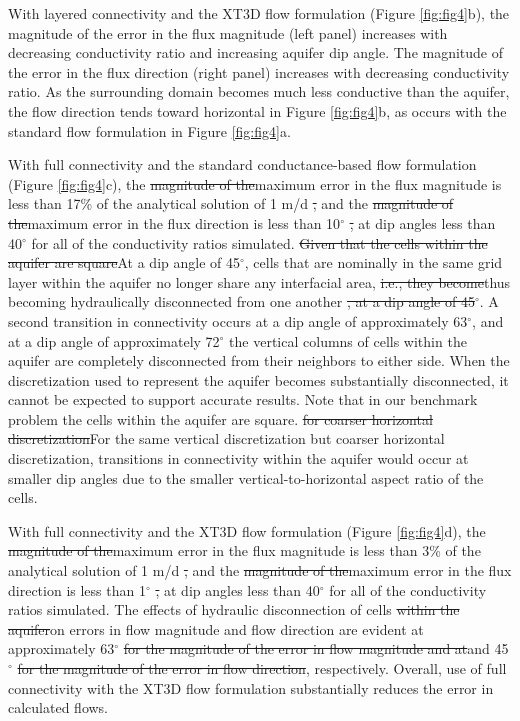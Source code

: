 \documentclass{article}
\begin{document}
With layered connectivity and the XT3D flow formulation (Figure \ref{fig:fig4}b), the magnitude of the error in the flux magnitude (left panel) increases with decreasing conductivity ratio and increasing aquifer dip angle. The magnitude of the error in the flux direction (right panel) increases with decreasing conductivity ratio. As the surrounding domain becomes much less conductive than the aquifer, the flow direction tends toward horizontal {\color{red} in Figure \ref{fig:fig4}b}, as {\color{red} occurs} with the standard flow formulation {\color{red} in Figure \ref{fig:fig4}a}.

With full connectivity and the standard conductance-based flow formulation (Figure \ref{fig:fig4}c), the {\color{red}\sout{magnitude of the}maximum} error in the flux magnitude is less than 17\% of the analytical solution of 1 m/d{\color{red} \sout{,}} and the {\color{red}\sout{magnitude of the}maximum} error in the flux direction is less than 10$^{\circ}${\color{red} \sout{,}} at dip angles less than 40$^{\circ}$ for all of the conductivity ratios simulated. {\color{red} \sout{Given that the cells within the aquifer are square}At a dip angle of  45$^{\circ}$}, cells that are nominally in the same grid layer within the aquifer no longer share any interfacial area, {\color{red} \sout{i.e., they become}thus becoming} hydraulically disconnected from one another{\color{red} \sout{, at a dip angle of 45$^{\circ}$}}. A second transition in connectivity occurs at a dip angle of approximately 63$^{\circ}$, and at a dip angle of approximately 72$^{\circ}$ the vertical columns of cells within the aquifer are completely disconnected from their neighbors to either side. When the discretization used to represent the aquifer becomes substantially disconnected, it cannot be expected to support accurate results. Note that {\color{red}in our benchmark problem the cells within the aquifer are square. \sout{for coarser horizontal discretization}For the same vertical discretization but coarser horizontal discretization}, transitions in connectivity within the aquifer would occur at smaller dip angles {\color{red} due to the smaller vertical-to-horizontal aspect ratio of the cells}.

With full connectivity and the XT3D flow formulation (Figure \ref{fig:fig4}d), the {\color{red}\sout{magnitude of the}maximum} error in the flux magnitude is less than 3\% of the analytical solution of 1 m/d{\color{red} \sout{,}} and the {\color{red}\sout{magnitude of the}maximum} error in the flux direction is less than 1$^{\circ}${\color{red} \sout{,}} at dip angles less than 40$^{\circ}$ for all of the conductivity ratios simulated. The effects of hydraulic disconnection of cells {\color{red} \sout{within the aquifer}on errors in flow magnitude and flow direction} are evident at approximately 63$^{\circ}$ {\color{red} \sout{for the magnitude of the error in flow magnitude and at}and} 45$^{\circ}${\color{red} \sout{ for the magnitude of the error in flow direction}, respectively}. Overall, use of full connectivity with the XT3D flow formulation substantially reduces the error in calculated flows.
\end{document}

